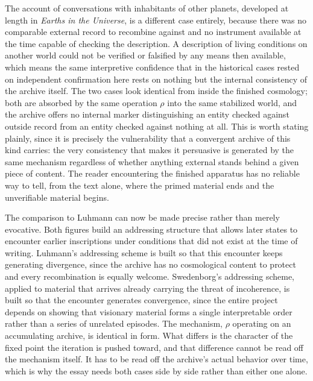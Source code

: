 \documentclass[11pt]{article}
\begin{document}
The account of conversations with inhabitants of other planets, developed at length in \emph{Earths in the Universe}, is a different case entirely, because there was no comparable external record to recombine against and no instrument available at the time capable of checking the description. A description of living conditions on another world could not be verified or falsified by any means then available, which means the same interpretive confidence that in the historical cases rested on independent confirmation here rests on nothing but the internal consistency of the archive itself. The two cases look identical from inside the finished cosmology; both are absorbed by the same operation $\rho$ into the same stabilized world, and the archive offers no internal marker distinguishing an entity checked against outside record from an entity checked against nothing at all. This is worth stating plainly, since it is precisely the vulnerability that a convergent archive of this kind carries: the very consistency that makes it persuasive is generated by the same mechanism regardless of whether anything external stands behind a given piece of content. The reader encountering the finished apparatus has no reliable way to tell, from the text alone, where the primed material ends and the unverifiable material begins.

The comparison to Luhmann can now be made precise rather than merely evocative. Both figures build an addressing structure that allows later states to encounter earlier inscriptions under conditions that did not exist at the time of writing. Luhmann's addressing scheme is built so that this encounter keeps generating divergence, since the archive has no cosmological content to protect and every recombination is equally welcome. Swedenborg's addressing scheme, applied to material that arrives already carrying the threat of incoherence, is built so that the encounter generates convergence, since the entire project depends on showing that visionary material forms a single interpretable order rather than a series of unrelated episodes. The mechanism, $\rho$ operating on an accumulating archive, is identical in form. What differs is the character of the fixed point the iteration is pushed toward, and that difference cannot be read off the mechanism itself. It has to be read off the archive's actual behavior over time, which is why the essay needs both cases side by side rather than either one alone.
\end{document}
